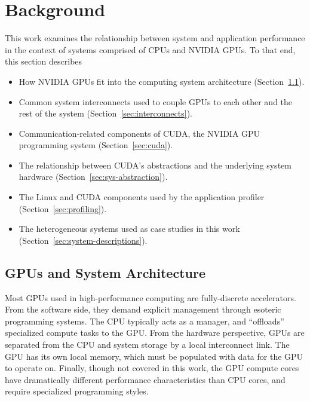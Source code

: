 \chapter{Background}
\label{ch:background}

This work examines the relationship between system and application performance in the context of systems comprised of CPUs and NVIDIA GPUs.
To that end, this section describes
\begin{itemize}
\item How NVIDIA GPUs fit into the computing system architecture (Section~\ref{sec:gpu-sys-arch}).
\item Common system interconnects used to couple GPUs to each other and the rest of the system (Section~\ref{sec:interconnects}).
\item Communication-related components of CUDA, the NVIDIA GPU programming system (Section~\ref{sec:cuda}).
\item The relationship between CUDA's abstractions and the underlying system hardware (Section~\ref{sec:sys-abstraction}).
\item The Linux and CUDA components used by the application profiler (Section~\ref{sec:profiling}).
\item The heterogeneous systems used as case studies in this work (Section~\ref{sec:system-descriptions}).
\end{itemize}

\section{GPUs and System Architecture}
\label{sec:gpu-sys-arch}

Most GPUs used in high-performance computing are fully-discrete accelerators.
From the software side, they demand explicit management through esoteric programming systems.
The CPU typically acts as a manager,  and ``offloads'' specialized compute tasks to the GPU.
From the hardware perspective, GPUs are separated from the CPU and system storage by a local interconnect link.
The GPU has its own local memory, which must be populated with data for the GPU to operate on.
Finally, though not covered in this work, the GPU compute cores have dramatically different performance characteristics than CPU cores, and require specialized programming styles.


